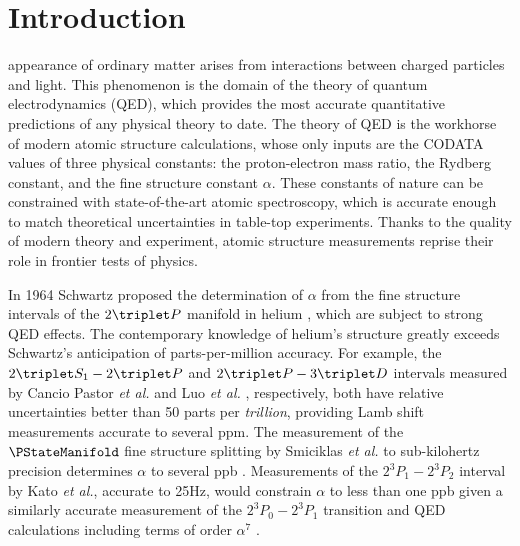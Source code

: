 

\section{Introduction}

   appearance of ordinary matter arises from interactions between charged particles and light.
	This phenomenon is the domain of the theory of quantum electrodynamics (QED), which provides the most accurate quantitative predictions of any physical theory to date.
	The theory of QED is the workhorse of modern atomic structure calculations, whose only inputs are the CODATA values of three physical constants: the proton-electron mass ratio, the Rydberg constant, and the fine structure constant $\alpha$.
	These constants of nature can be constrained with state-of-the-art atomic spectroscopy, which is accurate enough to match theoretical uncertainties in table-top experiments.
	Thanks to the quality of modern theory and experiment, atomic structure measurements reprise their role in frontier tests of physics.
	

  In 1964 Schwartz proposed the determination of $\alpha$ from the fine structure intervals of the $2\triplet P$ manifold in helium \cite{Schwartz64}, which are subject to strong QED effects.
	The contemporary knowledge of helium's structure greatly exceeds Schwartz's anticipation of parts-per-million accuracy.
	For example, the $2\triplet S_1 - 2\triplet P$ and $2\triplet P - 3\triplet D$ intervals measured by Cancio Pastor \textit{et al.} \cite{Pastor04} and Luo \emph{et al.} \cite{Luo16}, respectively, both have relative uncertainties better than 50 parts per \emph{trillion}, providing Lamb shift measurements accurate to several ppm.
	The measurement of the $\PStateManifold$ fine structure splitting by Smiciklas \textit{et al.} to sub-kilohertz precision determines $\alpha$ to several ppb \cite{Smiciklas10}.
	Measurements of the $2^{3\!}P_1-2^{3\!}P_2$ interval by Kato \emph{et al.}, accurate to 25Hz, would constrain $\alpha$ to less than one ppb given a similarly accurate measurement of the $2^{3\!}P_0 - 2^{3\!}P_1$ transition and QED calculations including terms of order $\alpha^7$ \cite{Kato18}.
	

